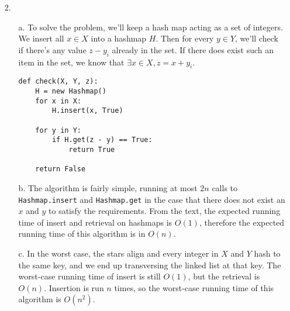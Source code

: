 \documentclass{article}
\begin{document}
\begin{enumerate}
\item [2.]
    \begin{enumerate}
    \item [a.] To solve the problem, we'll keep a hash map acting as a set of integers. We insert all $x \in X$ into a hashmap $H$. Then for every $y \in Y$, we'll check if there's any value $z - y_i$ already in the set. If there does exist such an item in the set, we know that $\exists x \in X, z = x + y_i$.

\begin{lstlisting}
def check(X, Y, z):
    H = new Hashmap()
    for x in X:
        H.insert(x, True)

    for y in Y:
        if H.get(z - y) == True:
            return True

    return False
\end{lstlisting}


    \item [b.] The algorithm is fairly simple, running at most $2n$ calls to \texttt{Hashmap.insert} and \texttt{Hashmap.get} in the case that there does not exist an $x$ and $y$ to satisfy the requirements. From the text, the expected running time of insert and retrieval on hashmaps is $O(1)$, therefore the expected running time of this algorithm is in $O(n)$.

    \item [c.] In the worst case, the stars align and every integer in $X$ and $Y$ hash to the same key, and we end up transversing the linked list at that key. The worst-case running time of insert is still $O(1)$, but the retrieval is $O(n)$. Insertion is run $n$ times, so the worst-case running time of this algorithm is $O(n^2)$.

    \end{enumerate}
\end{enumerate}
\end{document}
